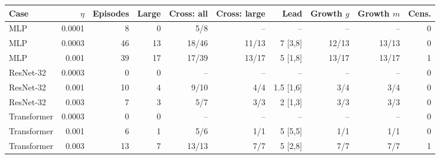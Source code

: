 \begin{tabular}{lrrrrrrrrr}
\hline
Case & $\eta$ & Episodes & Large & Cross: all & Cross: large & Lead & Growth $g$ & Growth $m$ & Cens. \\
\hline
MLP & 0.0001 & 8 & 0 & 5/8 & -- & -- & -- & -- & 0 \\
MLP & 0.0003 & 46 & 13 & 18/46 & 11/13 & 7 [3,8] & 12/13 & 13/13 & 0 \\
MLP & 0.001 & 39 & 17 & 17/39 & 13/17 & 5 [1,8] & 13/17 & 13/17 & 1 \\
ResNet-32 & 0.0003 & 0 & 0 & -- & -- & -- & -- & -- & 0 \\
ResNet-32 & 0.001 & 10 & 4 & 9/10 & 4/4 & 1.5 [1,6] & 3/4 & 3/4 & 0 \\
ResNet-32 & 0.003 & 7 & 3 & 5/7 & 3/3 & 2 [1,3] & 3/3 & 3/3 & 0 \\
Transformer & 0.0003 & 0 & 0 & -- & -- & -- & -- & -- & 0 \\
Transformer & 0.001 & 6 & 1 & 5/6 & 1/1 & 5 [5,5] & 1/1 & 1/1 & 0 \\
Transformer & 0.003 & 13 & 7 & 13/13 & 7/7 & 5 [2,8] & 7/7 & 7/7 & 1 \\
\hline
\end{tabular}

